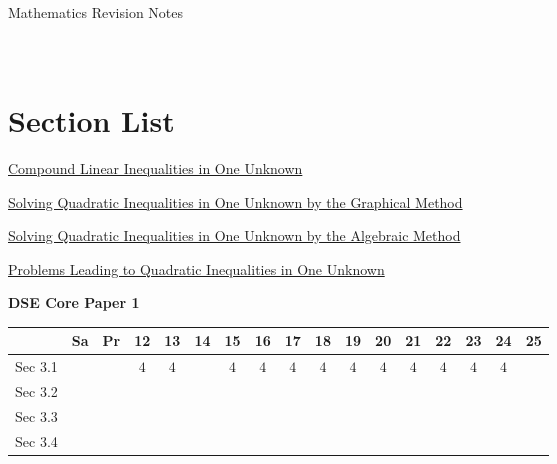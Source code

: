 \documentclass[12pt, a4paper]{article}
\begin{document}
\newpage
\newpage
\thispagestyle{empty}
\begin{center}
Mathematics Revision Notes\\\vspace{1cm}
\\\vspace{1cm}
{\fontsize{24pt}{24pt}\selectfont {Inequalities}} \\\vspace{1cm}
\label{chapter:S5-3}

\end{center}
\vspace{0.5cm}
\hline
\section*{Section List}
\begin{enumx}[label=Sec 3.\arabic*\ ]
\item \hyperref[section:5-3-1]{Compound Linear Inequalities in One Unknown}
\item \hyperref[section:5-3-2]{Solving Quadratic Inequalities in One Unknown by the Graphical Method}
\item \hyperref[section:5-3-3]{Solving Quadratic Inequalities in One Unknown by the Algebraic Method \NF}
\item \hyperref[section:5-3-4]{Problems Leading to Quadratic Inequalities in One Unknown}
\end{enumx}
\begin{absolutelynopagebreak}
\begin{center}
\textbf{DSE Core Paper 1}
\end{center}
\begin{center}
\begin{tabular}{|l|c|c|c|c|c|c|c|c|c|c|c|c|c|c|c|c|}
\hline
        & Sa & Pr & 12 & 13 & 14 & 15 & 16 & 17 & 18 & 19 & 20 & 21 & 22 & 23 & 24 & 25 \\\hline\hline
Sec 3.1 &  &  &  $4$ &  $4$ &  &  $4$ &  $4$ &  $4$ &  $4$ &  $4$ &  $4$ &  $4$ &  $4$ &  $4$ &  $4$ &  \\\hline
Sec 3.2 &  &  &  &  &  &  &  &  &  &  &  &  &  &  &  &  \\\hline
Sec 3.3 &  &  &  &  &  &  &  &  &  &  &  &  &  &  &  &  \\\hline
Sec 3.4 &  &  &  &  &  &  &  &  &  &  &  &  &  &  &  &  \\\hline
\end{tabular}
\end{center}
\end{absolutelynopagebreak}
\end{document}
